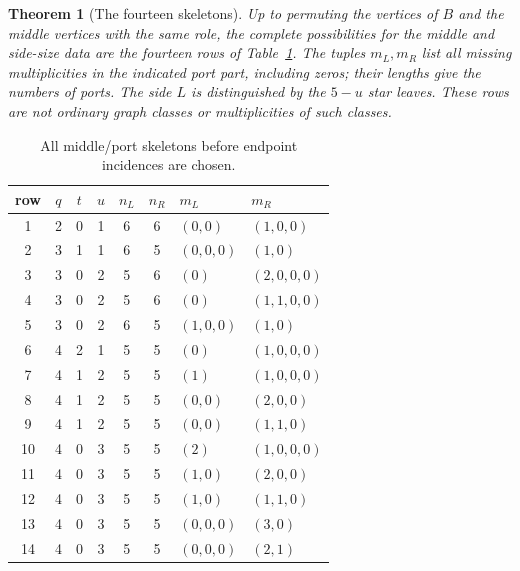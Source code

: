\documentclass[11pt]{article}
\newtheorem{theorem}{Theorem}
\begin{document}
\begin{theorem}[The fourteen skeletons]\label{fourteen}
Up to permuting the vertices of $B$ and the middle vertices with
the same role, the complete possibilities for the middle and
side-size data are the fourteen rows of Table~\ref{table}.
The tuples $m_L,m_R$ list all missing multiplicities in the indicated
port part, including zeros; their lengths give the numbers of ports.
The side $L$ is distinguished by the $5-u$ star leaves. These rows
are not ordinary graph classes or multiplicities of such classes.
\end{theorem}
\begin{table}[h]\centering\small
\begin{tabular}{c|ccc|cc|l|l}
\toprule
row&$q$&$t$&$u$&$n_L$&$n_R$&$m_L$&$m_R$\\\midrule
1&2&0&1&6&6&$(0,0)$&$(1,0,0)$\\
2&3&1&1&6&5&$(0,0,0)$&$(1,0)$\\
3&3&0&2&5&6&$(0)$&$(2,0,0,0)$\\
4&3&0&2&5&6&$(0)$&$(1,1,0,0)$\\
5&3&0&2&6&5&$(1,0,0)$&$(1,0)$\\
6&4&2&1&5&5&$(0)$&$(1,0,0,0)$\\
7&4&1&2&5&5&$(1)$&$(1,0,0,0)$\\
8&4&1&2&5&5&$(0,0)$&$(2,0,0)$\\
9&4&1&2&5&5&$(0,0)$&$(1,1,0)$\\
10&4&0&3&5&5&$(2)$&$(1,0,0,0)$\\
11&4&0&3&5&5&$(1,0)$&$(2,0,0)$\\
12&4&0&3&5&5&$(1,0)$&$(1,1,0)$\\
13&4&0&3&5&5&$(0,0,0)$&$(3,0)$\\
14&4&0&3&5&5&$(0,0,0)$&$(2,1)$\\\bottomrule
\end{tabular}
\caption{All middle/port skeletons before endpoint incidences are chosen.}
\label{table}\end{table}
\end{document}
